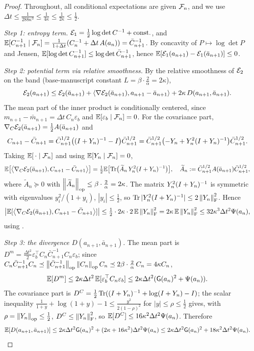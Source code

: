 \begin{proof}
Throughout, all conditional expectations are given $\mathcal{F}_n$, and we use
$\Delta t\leq\tfrac1{288\kappa^3}\leq\tfrac1{4\kappa}\leq\tfrac1{2\kappa}\leq\tfrac12$.

\emph{Step 1: entropy term.} $\mathcal{E}_1=\tfrac12\log\det C^{-1}+\text{const.}$, and
$\mathbb{E}[C_{n+1}^{-1}\mid\mathcal{F}_n]=\tfrac1{1+\Delta t}(C_n^{-1}+\Delta t\,A(a_n))=\bar C_{n+1}^{-1}$. By
concavity of $P\mapsto\log\det P$ and Jensen,
$\mathbb{E}[\log\det C_{n+1}^{-1}]\leq\log\det\bar C_{n+1}^{-1}$, hence
$\mathbb{E}[\mathcal{E}_1(a_{n+1})-\mathcal{E}_1(\bar a_{n+1})]\leq0$.

\emph{Step 2: potential term via relative smoothness.} By the relative smoothness of
$\mathcal{E}_2$ on the band (base-manuscript constant $L=\beta\cdot\tfrac2\alpha=2\kappa$),
\[
    \mathcal{E}_2(a_{n+1})
    \leq
    \mathcal{E}_2(\bar a_{n+1})
    +
    \left\langle \nabla\mathcal{E}_2(\bar a_{n+1}),a_{n+1}-\bar a_{n+1}\right\rangle
    +
    2\kappa\,D(a_{n+1},\bar a_{n+1}).
\]
The mean part of the inner product is conditionally centered, since
$m_{n+1}-\bar m_{n+1}=\Delta t\,C_n\varepsilon_b$ and $\mathbb{E}[\varepsilon_b\mid\mathcal{F}_n]=0$. For the
covariance part, $\nabla_C\mathcal{E}_2(\bar a_{n+1})=\tfrac12A(\bar a_{n+1})$ and
\[
    C_{n+1}-\bar C_{n+1}
    =
    \bar C_{n+1}^{1/2}\bigl((I+Y_n)^{-1}-I\bigr)\bar C_{n+1}^{1/2}
    =
    \bar C_{n+1}^{1/2}\bigl(-Y_n+Y_n^2(I+Y_n)^{-1}\bigr)\bar C_{n+1}^{1/2}.
\]
Taking $\mathbb{E}[\,\cdot\mid\mathcal{F}_n]$ and using $\mathbb{E}[Y_n\mid\mathcal{F}_n]=0$,
\[
    \mathbb{E}\bigl[\left\langle \nabla_C\mathcal{E}_2(\bar a_{n+1}),C_{n+1}-\bar C_{n+1}\right\rangle\bigr]
    =
    \tfrac12\mathbb{E}\bigl[\operatorname{Tr}\bigl(\widetilde A_n\,Y_n^2(I+Y_n)^{-1}\bigr)\bigr],
    \quad
    \widetilde A_n:=\bar C_{n+1}^{1/2}A(\bar a_{n+1})\bar C_{n+1}^{1/2},
\]
where $\widetilde A_n\succeq0$ with $\left\lVert \widetilde A_n\right\rVert_{\mathrm{op}}\leq\beta\cdot\tfrac2\alpha=2\kappa$.
The matrix $Y_n^2(I+Y_n)^{-1}$ is symmetric with eigenvalues $y_i^2/(1+y_i)$,
$|y_i|\leq\tfrac12$, so $\operatorname{Tr}|Y_n^2(I+Y_n)^{-1}|\leq2\left\lVert Y_n\right\rVert_{\mathrm{F}}^2$. Hence
\[
    \bigl|\mathbb{E}[\left\langle \nabla_C\mathcal{E}_2(\bar a_{n+1}),C_{n+1}-\bar C_{n+1}\right\rangle]\bigr|
    \leq
    \tfrac12\cdot2\kappa\cdot2\,\mathbb{E}\left\lVert Y_n\right\rVert_{\mathrm{F}}^2
    =
    2\kappa\,\mathbb{E}\left\lVert Y_n\right\rVert_{\mathrm{F}}^2
    \leq
    32\kappa^3\Delta t^2\Psi(a_n),
\]
using .

\emph{Step 3: the divergence $D(a_{n+1},\bar a_{n+1})$.}
The mean part is $D^m=\tfrac{\Delta t^2}2\varepsilon_b^\top C_n\bar C_{n+1}^{-1}C_n\varepsilon_b$;
since $C_n\bar C_{n+1}^{-1}C_n\preceq\left\lVert \bar C_{n+1}^{-1}\right\rVert_{\mathrm{op}}\left\lVert C_n\right\rVert_{\mathrm{op}}C_n\preceq2\beta\cdot\tfrac2\alpha\,C_n=4\kappa C_n$,
\[
    \mathbb{E}[D^m]\leq2\kappa\Delta t^2\,\mathbb{E}[\varepsilon_b^\top C_n\varepsilon_b]\leq2\kappa\Delta t^2(\mathsf{G}(a_n)^2+\Psi(a_n)).
\]
The covariance part is $D^C=\tfrac12\operatorname{Tr}((I+Y_n)^{-1}+\log(I+Y_n)-I)$; the scalar
inequality $\tfrac1{1+y}+\log(1+y)-1\leq\tfrac{y^2}{2(1-\rho)^2}$ for $|y|\leq\rho\leq\tfrac12$
gives, with $\rho=\left\lVert Y_n\right\rVert_{\mathrm{op}}\leq\tfrac12$, $D^C\leq\left\lVert Y_n\right\rVert_{\mathrm{F}}^2$, so
$\mathbb{E}[D^C]\leq16\kappa^2\Delta t^2\Psi(a_n)$. Therefore
\[
    \mathbb{E}[D(a_{n+1},\bar a_{n+1})]
    \leq
    2\kappa\Delta t^2\mathsf{G}(a_n)^2+(2\kappa+16\kappa^2)\Delta t^2\Psi(a_n)
    \leq
    2\kappa\Delta t^2\mathsf{G}(a_n)^2+18\kappa^2\Delta t^2\Psi(a_n).
\]


\end{proof}
